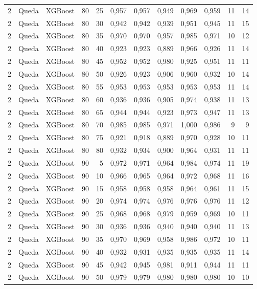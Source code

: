 \begin{longtable}{@{}rllrrrrrrrrr@{}}
2 & Queda & XGBoost & 80 & 25 & 0,957 & 0,957 & 0,949 & 0,969 & 0,959 & 11 & 14 \\
2 & Queda & XGBoost & 80 & 30 & 0,942 & 0,942 & 0,939 & 0,951 & 0,945 & 11 & 15 \\
2 & Queda & XGBoost & 80 & 35 & 0,970 & 0,970 & 0,957 & 0,985 & 0,971 & 10 & 12 \\
2 & Queda & XGBoost & 80 & 40 & 0,923 & 0,923 & 0,889 & 0,966 & 0,926 & 11 & 14 \\
2 & Queda & XGBoost & 80 & 45 & 0,952 & 0,952 & 0,980 & 0,925 & 0,951 & 11 & 11 \\
2 & Queda & XGBoost & 80 & 50 & 0,926 & 0,923 & 0,906 & 0,960 & 0,932 & 10 & 14 \\
2 & Queda & XGBoost & 80 & 55 & 0,953 & 0,953 & 0,953 & 0,953 & 0,953 & 11 & 14 \\
2 & Queda & XGBoost & 80 & 60 & 0,936 & 0,936 & 0,905 & 0,974 & 0,938 & 11 & 13 \\
2 & Queda & XGBoost & 80 & 65 & 0,944 & 0,944 & 0,923 & 0,973 & 0,947 & 11 & 13 \\
2 & Queda & XGBoost & 80 & 70 & 0,985 & 0,985 & 0,971 & 1,000 & 0,986 & 9 & 9 \\
2 & Queda & XGBoost & 80 & 75 & 0,921 & 0,918 & 0,889 & 0,970 & 0,928 & 10 & 11 \\
2 & Queda & XGBoost & 80 & 80 & 0,932 & 0,934 & 0,900 & 0,964 & 0,931 & 11 & 11 \\
2 & Queda & XGBoost & 90 & 5 & 0,972 & 0,971 & 0,964 & 0,984 & 0,974 & 11 & 19 \\
2 & Queda & XGBoost & 90 & 10 & 0,966 & 0,965 & 0,964 & 0,972 & 0,968 & 11 & 16 \\
2 & Queda & XGBoost & 90 & 15 & 0,958 & 0,958 & 0,958 & 0,964 & 0,961 & 11 & 15 \\
2 & Queda & XGBoost & 90 & 20 & 0,974 & 0,974 & 0,976 & 0,976 & 0,976 & 11 & 12 \\
2 & Queda & XGBoost & 90 & 25 & 0,968 & 0,968 & 0,979 & 0,959 & 0,969 & 10 & 11 \\
2 & Queda & XGBoost & 90 & 30 & 0,936 & 0,936 & 0,940 & 0,940 & 0,940 & 11 & 13 \\
2 & Queda & XGBoost & 90 & 35 & 0,970 & 0,969 & 0,958 & 0,986 & 0,972 & 10 & 11 \\
2 & Queda & XGBoost & 90 & 40 & 0,932 & 0,931 & 0,935 & 0,935 & 0,935 & 11 & 14 \\
2 & Queda & XGBoost & 90 & 45 & 0,942 & 0,945 & 0,981 & 0,911 & 0,944 & 11 & 11 \\
2 & Queda & XGBoost & 90 & 50 & 0,979 & 0,979 & 0,980 & 0,980 & 0,980 & 10 & 10 \\

\end{longtable}
